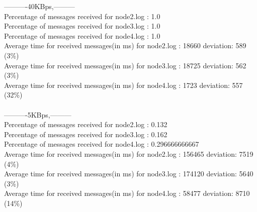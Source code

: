         ----------40KBps,---------\\
        Percentage of messages received for node2.log : 1.0\\
        Percentage of messages received for node3.log : 1.0\\
        Percentage of messages received for node4.log : 1.0\\
        Average time for received messages(in ms) for  node2.log : 18660 	deviation: 589 (3\%)\\
        Average time for received messages(in ms) for  node3.log : 18725 	deviation: 562 (3\%)\\
        Average time for received messages(in ms) for  node4.log : 1723 	deviation: 557 (32\%)\\\\
        ----------5KBps,---------\\
        Percentage of messages received for node2.log : 0.132\\
        Percentage of messages received for node3.log : 0.162\\
        Percentage of messages received for node4.log : 0.296666666667\\
        Average time for received messages(in ms) for  node2.log : 156465 	deviation: 7519 (4\%)\\
        Average time for received messages(in ms) for  node3.log : 174120 	deviation: 5640 (3\%)\\
        Average time for received messages(in ms) for  node4.log : 58477 	deviation: 8710 (14\%)\\\\

